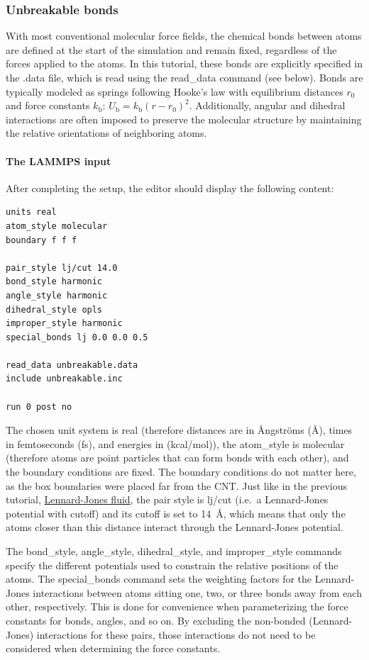 \documentclass[9pt,tutorial]{livecoms}
\newcommand{\lmpcmd}[1]{\colorbox{listing}{\textcolor{command}{\small{#1}}}} %
\begin{document}
\subsubsection{Unbreakable bonds}

With most conventional molecular force fields, the chemical bonds
between atoms are defined at the start of the simulation and remain
fixed, regardless of the forces applied to the atoms.  {\color{blue}In
  this tutorial, these bonds are explicitly specified in the
  \lmpcmd{.data} file, which is read using the \lmpcmd{read\_data}
  command (see below).}
Bonds are typically modeled as springs {\color{blue}following Hooke's
law} with equilibrium distances $r_0$ and force constants $k_\text{b}$:
$U_\text{b} = k_\text{b} \left( r - r_0 \right)^2$.  Additionally,
angular and dihedral {\color{blue}interactions} are often imposed to
preserve the molecular structure by maintaining the relative
orientations of neighboring atoms.

\paragraph{The LAMMPS input}

After completing the setup, the editor should display the following content:
\begin{lstlisting}
units real
atom_style molecular
boundary f f f

pair_style lj/cut 14.0
bond_style harmonic
angle_style harmonic
dihedral_style opls
improper_style harmonic
special_bonds lj 0.0 0.0 0.5

read_data unbreakable.data
include unbreakable.inc

run 0 post no
\end{lstlisting}
The chosen unit system is \lmpcmd{real} (therefore distances are in
Ångströms (Å), times in femtoseconds (fs), and energies in (kcal/mol)), the
\lmpcmd{atom\_style} is \lmpcmd{molecular} (therefore atoms are point
particles that can form bonds with each other), and the boundary
conditions are fixed.  The boundary conditions do not matter here, as
the box boundaries were placed far from the CNT.  Just like in the
previous tutorial, \hyperref[lennard-jones-label]{Lennard-Jones fluid},
the pair style is \lmpcmd{lj/cut} (i.e.~a Lennard-Jones potential with
cutoff) and its cutoff is set to 14~Å, which means that only the
atoms closer than this distance interact through the Lennard-Jones
potential.

The \lmpcmd{bond\_style}, \lmpcmd{angle\_style},
\lmpcmd{dihedral\_style}, and \lmpcmd{improper\_style} commands specify
the different potentials used to constrain the relative positions of the
atoms.  The \lmpcmd{special\_bonds} command sets the weighting factors
for the Lennard-Jones interactions {\color{blue}between atoms sitting one,
two, or three bonds away from each other, respectively.}  This is done for
convenience when parameterizing the force constants for bonds, angles, and
so on.  By excluding the non-bonded (Lennard-Jones) interactions for
these pairs, those interactions do not need to be considered when determining
the force constants.
\end{document}

